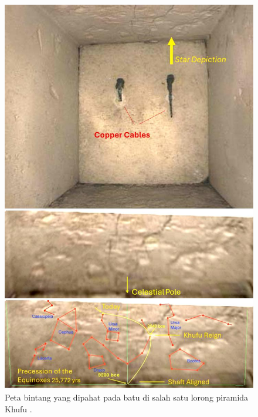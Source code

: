\documentclass[10pt,twocolumn,letterpaper]{article}
\begin{document}
\begin{figure}[H]
\begin{center}
   \includegraphics[width=1\linewidth]{star-stone.jpg}
\end{center}
   \caption{Peta bintang yang dipahat pada batu di salah satu lorong piramida Khufu \cite{28}.}
\label{fig:20}
\label{fig:onecol}
\end{figure}
\end{document}
